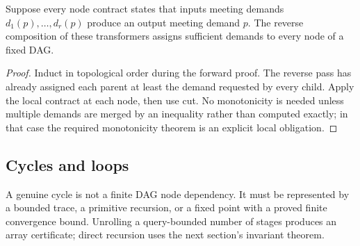 \begin{proposition}
Suppose every node contract states that inputs meeting demands
\(d_1(p),\ldots,d_r(p)\) produce an output meeting demand \(p\).  The reverse
composition of these transformers assigns sufficient demands to every node of
a fixed DAG.
\end{proposition}

\begin{proof}
Induct in topological order during the forward proof.  The reverse pass has
already assigned each parent at least the demand requested by every child.
Apply the local contract at each node, then use cut.  No monotonicity is needed
unless multiple demands are merged by an inequality rather than computed
exactly; in that case the required monotonicity theorem is an explicit local
obligation.
\end{proof}

\subsection{Cycles and loops}

A genuine cycle is not a finite DAG node dependency.  It must be represented by
a bounded trace, a primitive recursion, or a fixed point with a proved finite
convergence bound.  Unrolling a query-bounded number of stages produces an
array certificate; direct recursion uses the next section's invariant theorem.

